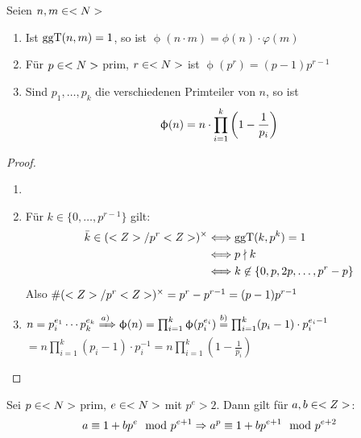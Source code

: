 \begin{proposition}
	Seien $n,m \in <N>$
	\begin{enumerate}
		\item Ist $\operatorname{ggT}(n,m) = 1$, so ist $\upphi(n\cdot m) = \phi(n)\cdot \varphi(m)$
		\item Für $p \in <N>$ prim, $r \in <N>$ ist $\upphi(p^r) = (p-1)p^{r-1}$
		\item Sind $p_1,\dots, p_k$ die verschiedenen Primteiler von $n$, so ist
		\begin{align}
		\upphi(n) = n \cdot \prod_{i=1}^{k}\left( 1- \frac{1}{p_i}\right) \notag
		\end{align}
	\end{enumerate}
\end{proposition}

\begin{proof}
	\begin{enumerate}
		\item {}
		\item Für $k \in \{0,\dots,p^{r-1}\}$ gilt:
		\begin{align}
			\bar{k} \in (<Z> / p^r <Z>)^{\times} &\Longleftrightarrow \operatorname{ggT}(k, p^k) = 1\notag \\
			&\Longleftrightarrow p \nmid k\notag \\
			&\Longleftrightarrow k \not \in \{0, p, 2p, \dots, p^r-p\}\notag
		\end{align}
		Also $\#(<Z> /p^r <Z>)^{\times} = p^r - p^{r-1} = (p-1)p^{r-1}$
		\item $n = p_i^{e_1}\cdots p_k^{e_k} \xRightarrow{a)} \upphi(n) = \prod_{i = 1}^{k} \upphi(p_i^{e_i}) \overset{b)}{=} \prod_{i=1}^{k} (p_i - 1)\cdot p_i^{e_i - 1}$\\
		$= n \prod_{i=1}^{k}(p_i - 1)\cdot p_i^{-1} = n \prod_{i=1}^{k}(1-\frac{1}{p_i})$
	\end{enumerate}
\end{proof}

\begin{lemma}
	Sei $p \in <N>$ prim, $e \in <N>$ mit $p^{e} > 2$. Dann gilt für $a,b \in <Z>$:
	\begin{align}
		a \equiv 1 + bp^{e} \mod p^{e+1} \Rightarrow a^p \equiv 1 + bp^{e+1} \mod p^{e+2} \notag
	\end{align}
\end{lemma}

